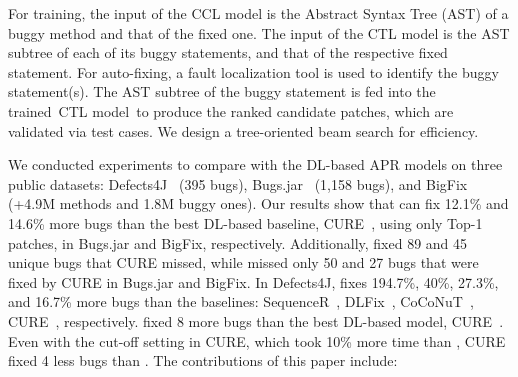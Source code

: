 For training, the input of the CCL model is the Abstract
Syntax Tree (AST) of a buggy method and that of the fixed one.
The input of the CTL model is the AST subtree of each of its buggy
statements, and that of the respective fixed statement. For
auto-fixing, a fault localization tool is used to identify the buggy
statement(s). The AST subtree of the buggy statement is fed into the
trained~CTL model~to produce the ranked candidate patches, which are
validated via test cases. We design a tree-oriented beam search
for efficiency.


We conducted experiments to compare {\tool} with the DL-based APR
models on three public datasets: Defects4J~\cite{defects4j} (395
bugs), Bugs.jar~\cite{saha2018bugs} (1,158 bugs), and
BigFix~\cite{yioopsla19} (+4.9M methods and 1.8M buggy ones). Our
results show that {\tool} can fix 12.1\% and 14.6\% more bugs than the
best DL-based baseline, CURE~\cite{cure-icse21}, using only Top-1
patches, in Bugs.jar and BigFix, respectively. Additionally, {\tool}
fixed 89 and 45 unique bugs that CURE missed, while {\tool} missed
only 50 and 27 bugs that were fixed by CURE in Bugs.jar and BigFix. In
Defects4J, {\tool} fixes 194.7\%, 40\%, 27.3\%, and 16.7\% more bugs
than the baselines: SequenceR~\cite{chen2018sequencer},
DLFix~\cite{icse20}, CoCoNuT~\cite{lutellier2020coconut},
CURE~\cite{cure-icse21}, respectively. {\tool} fixed 8 more bugs than the
best DL-based model, CURE~\cite{cure-icse21}. Even with the cut-off
setting in CURE, which took 10\% more time than {\tool}, CURE fixed 4
less bugs than {\tool}. The contributions of this paper include:


